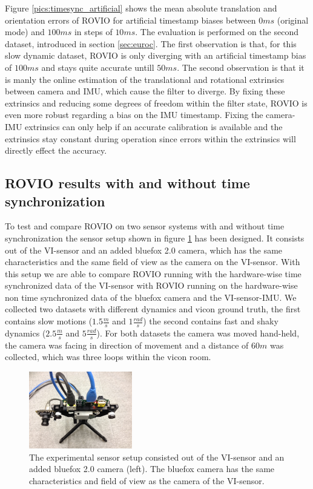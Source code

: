 Figure \ref{pics:timesync_artificial} shows the mean absolute translation and orientation errors of ROVIO for artificial timestamp biases between $0ms$ (original mode) and $100ms$ in steps of $10ms$. The evaluation is performed on the second dataset, introduced in section \ref{sec:euroc}. The first observation is that, for this slow dynamic dataset, ROVIO is only diverging with an artificial timestamp bias of $100ms$ and stays quite accurate untill $50ms$. The second observation is that it is manly the online estimation of the translational and rotational extrinsics between camera and IMU, which cause the filter to diverge. By fixing these extrinsics and reducing some degrees of freedom within the filter state, ROVIO is even more robust regarding a bias on the IMU timestamp. Fixing the camera-IMU extrinsics can only help if an accurate calibration is available and the extrinsics stay constant during operation since errors within the extrinsics will directly effect the accuracy.



\subsection{ROVIO results with and without time synchronization}
\label{sec:timesync_real}

To test and compare ROVIO on two sensor systems with and without time synchronization the sensor setup shown in figure \ref{pics:vi_bluefox} has been designed. It consists out of the VI-sensor and an added bluefox 2.0 camera, which has the same characteristics and the same field of view as the camera on the VI-sensor. With this setup we are able to compare ROVIO running with the hardware-wise time synchronized data of the VI-sensor with ROVIO running on the hardware-wise non time synchronized data of the bluefox camera and the VI-sensor-IMU. We collected two datasets with different dynamics and vicon ground truth, the first contains slow motions ($1.5\frac{m}{s}$ and $1\frac{rad}{s}$) the second contains fast and shaky dynamics ($2.5\frac{m}{s}$ and $5\frac{rad}{s}$). For both datasets the camera was moved hand-held, the camera was facing in direction of movement and a distance of $60m$ was collected, which was three loops within the vicon room. \\

\begin{figure}[h]
   \centering
   \includegraphics[width=0.4\textwidth]{images/vi_bluefox.JPG}
   \caption{The experimental sensor setup consisted out of the VI-sensor and an added bluefox 2.0 camera (left). The bluefox camera has the same characteristics and field of view as the camera of the VI-sensor.}
   \label{pics:vi_bluefox}
\end{figure}

